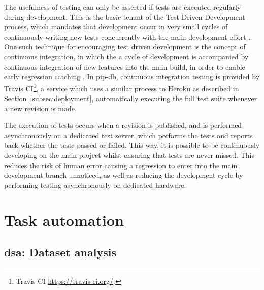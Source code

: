 The usefulness of testing can only be asserted if tests are executed
regularly during development. This is the basic tenant of the Test
Driven Development process, which mandates that development occur in
very small cycles of continuously writing new tests concurrently with
the main development effort \cite{beck2003test}. One such technique
for encouraging test driven development is the concept of continuous
integration, in which the a cycle of development is accompanied by
continuous integration of new features into the main build, in order
to enable early regression catching \cite{fowler2006continuous,
  duvall2007continuous}. In pip-db, continuous integration testing is
provided by Travis CI\footnote{Travis CI
  \url{https://travis-ci.org/}.}, a service which uses a similar
process to Heroku as described in Section~\ref{subsec:deployment},
automatically executing the full test suite whenever a new revision is
made.

The execution of tests occurs when a revision is published, and is
performed asynchronously on a dedicated test server, which performs
the tests and reports back whether the tests passed or failed. This
way, it is possible to be continuously developing on the main project
whilst ensuring that tests are never missed. This reduces the risk of
human error causing a regression to enter into the main development
branch unnoticed, as well as reducing the development cycle by
performing testing asynchronously on dedicated hardware.

\section{Task automation}\label{sec:task-automation}

\subsection{dsa: Dataset analysis}\label{subsec:dsa}



